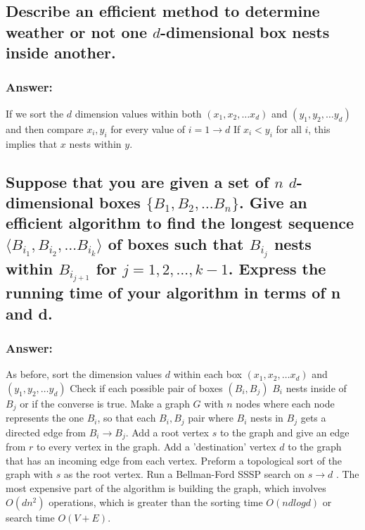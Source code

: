 \documentclass[titlepage]{article}
\theoremstyle{definition}
\begin{document}
  \subsection{Describe an efficient method to determine weather or not one
              $d$-dimensional box nests inside another.}
  \subsubsection{Answer:}
    If we sort the $d$ dimension values within both $(x_1, x_2, \dots x_d)$ and
    $(y_1, y_2, \dots y_d)$ and then compare $x_i, y_i$ for every value of $i =
    1 \to d$ If $x_i <y_i$ for all $i$, this implies that $x$ nests within $y$.
    
  \subsection{Suppose that you are given a set of $n$ $d$-dimensional boxes
        $\{B_1, B_2,\dots B_n\}$. Give an efficient algorithm to find the longest
        sequence $\langle B_{i_1}, B_{i_2},\dots B_{i_k}\rangle$ of boxes such that
        $B_{i_j}$ nests within  $B_{i_{j+1}}$ for $j = 1,2,\dots,k-1$. Express the
        running time of your algorithm in terms of n and d.}
  \subsubsection{Answer:}
    As before, sort the dimension values $d$ within each box $(x_1, x_2, \dots x_d)$ and
    $(y_1, y_2, \dots y_d)$ Check if each possible pair of boxes $(B_i, B_j)$
    $B_i$ nests inside of $B_j$ or if the converse is true. Make a graph $G$
    with $n$ nodes where each node represents the one $B_i$, so that each
    $B_i, B_j$ pair where $B_i$ nests in $ B_j$ gets a directed edge from $B_i
    \to B_j$. Add a root vertex $s$ to the graph and give an edge from $r$ to
    every vertex in the graph. Add a 'destination' vertex $d$ to the graph
    that has an incoming edge from each vertex. Preform a topological sort of the
    graph with $s$ as the root vertex. Run a Bellman-Ford SSSP search on $s
    \rightarrow d$ . The most expensive part of the algorithm is building the
    graph, which involves $O(dn^2)$ operations, which is greater than the
    sorting time $O(nd log d)$ or search time $O(V + E)$. 
\end{document}
